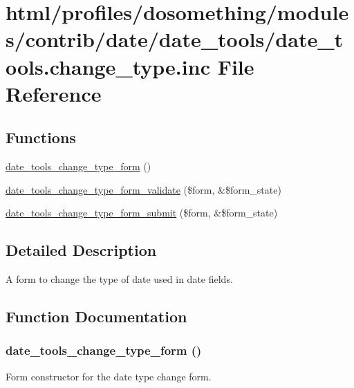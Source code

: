 \hypertarget{date__tools_8change__type_8inc}{
\section{html/profiles/dosomething/modules/contrib/date/date\_\-tools/date\_\-tools.change\_\-type.inc File Reference}
\label{date__tools_8change__type_8inc}
}
\subsection*{Functions}
\begin{DoxyCompactItemize}
\item 
\hyperlink{date__tools_8change__type_8inc_a3625710b4303ee2a2ac8ce19515e28fe}{date\_\-tools\_\-change\_\-type\_\-form} ()
\item 
\hyperlink{date__tools_8change__type_8inc_a537d4733f1472548340d382657ce2665}{date\_\-tools\_\-change\_\-type\_\-form\_\-validate} (\$form, \&\$form\_\-state)
\item 
\hyperlink{date__tools_8change__type_8inc_aa4d27716963ad04ea751a1deeb3daa28}{date\_\-tools\_\-change\_\-type\_\-form\_\-submit} (\$form, \&\$form\_\-state)
\end{DoxyCompactItemize}


\subsection{Detailed Description}
A form to change the type of date used in date fields. 

\subsection{Function Documentation}
\hypertarget{date__tools_8change__type_8inc_a3625710b4303ee2a2ac8ce19515e28fe}{
\subsubsection[{date\_\-tools\_\-change\_\-type\_\-form}]{\setlength{\rightskip}{0pt plus 5cm}date\_\-tools\_\-change\_\-type\_\-form ()}}
\label{date__tools_8change__type_8inc_a3625710b4303ee2a2ac8ce19515e28fe}
Form constructor for the date type change form.

